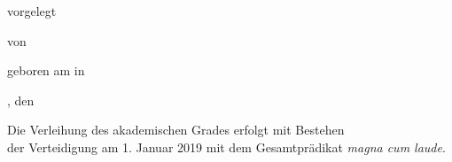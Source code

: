 \begin{titlepage}
\begin{addmargin}[-0.5cm]{-3cm}
\begin{center}
        \vfill

        \begingroup
             {vorgelegt} \\ \bigskip
        \endgroup
        
        \begingroup
            {von \myDegree \myName} \\ \bigskip
        \endgroup
        
        \begingroup
            {geboren am \myBirthday in \myPlaceOfBirth} \\ \bigskip
        \endgroup
        
        \vfill

         \begingroup
             {\myLocation, den \myDayTime} \\ \bigskip
         \endgroup
        
%

        \bigskip

        \begingroup
            {Die Verleihung des akademischen Grades erfolgt mit Bestehen} \\
            {der Verteidigung am 1. Januar 2019 mit dem Gesamtpr\"adikat \emph{magna cum laude}.} \\ \bigskip
        \endgroup

        \vfill                      

    \end{center}  
  \end{addmargin}       
\end{titlepage}   

